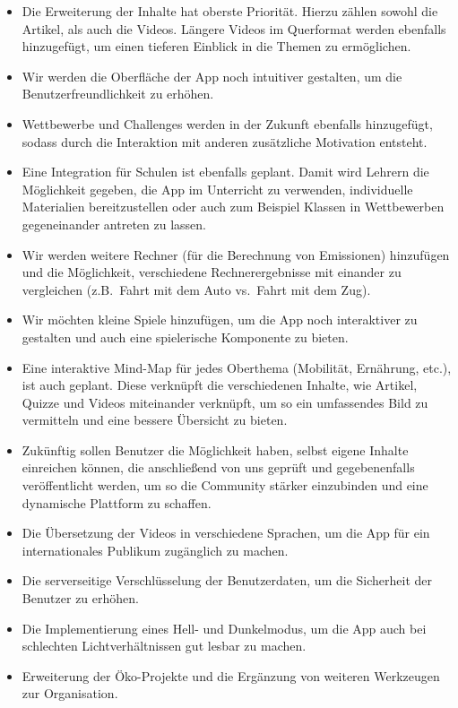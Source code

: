 \documentclass[../main.tex]{subfiles}
\begin{document}
    \begin{itemize}
        \item Die Erweiterung der Inhalte hat oberste Priorität.
        Hierzu zählen sowohl die Artikel, als auch die Videos.
        Längere Videos im Querformat werden ebenfalls hinzugefügt, um einen tieferen Einblick in die Themen zu ermöglichen.
        \item Wir werden die Oberfläche der App noch intuitiver gestalten, um die Benutzerfreundlichkeit zu erhöhen.
        \item Wettbewerbe und Challenges werden in der Zukunft ebenfalls hinzugefügt, sodass durch die Interaktion mit anderen zusätzliche Motivation entsteht.
        \item Eine Integration für Schulen ist ebenfalls geplant.
        Damit wird Lehrern die Möglichkeit gegeben, die App im Unterricht zu verwenden, individuelle Materialien bereitzustellen oder auch zum Beispiel Klassen in Wettbewerben gegeneinander antreten zu lassen.
        \item Wir werden weitere Rechner (für die Berechnung von Emissionen) hinzufügen und die Möglichkeit, verschiedene Rechnerergebnisse mit einander zu vergleichen (z.B.\ Fahrt mit dem Auto vs.\ Fahrt mit dem Zug).
        \item Wir möchten kleine Spiele hinzufügen, um die App noch interaktiver zu gestalten und auch eine spielerische Komponente zu bieten.
        \item Eine interaktive Mind-Map für jedes Oberthema (Mobilität, Ernährung, etc.), ist auch geplant.
        Diese verknüpft die verschiedenen Inhalte, wie Artikel, Quizze und Videos miteinander verknüpft, um so ein umfassendes Bild zu vermitteln und eine bessere Übersicht zu bieten.
        \item Zukünftig sollen Benutzer die Möglichkeit haben, selbst eigene Inhalte einreichen können, die anschließend von uns geprüft und gegebenenfalls veröffentlicht werden, um so die Community stärker einzubinden und eine dynamische Plattform zu schaffen.
        \item Die Übersetzung der Videos in verschiedene Sprachen, um die App für ein internationales Publikum zugänglich zu machen.
        \item Die serverseitige Verschlüsselung der Benutzerdaten, um die Sicherheit der Benutzer zu erhöhen.
        \item Die Implementierung eines Hell- und Dunkelmodus, um die App auch bei schlechten Lichtverhältnissen gut lesbar zu machen.
        \item Erweiterung der Öko-Projekte und die Ergänzung von weiteren Werkzeugen zur Organisation.
    \end{itemize}
\end{document}
